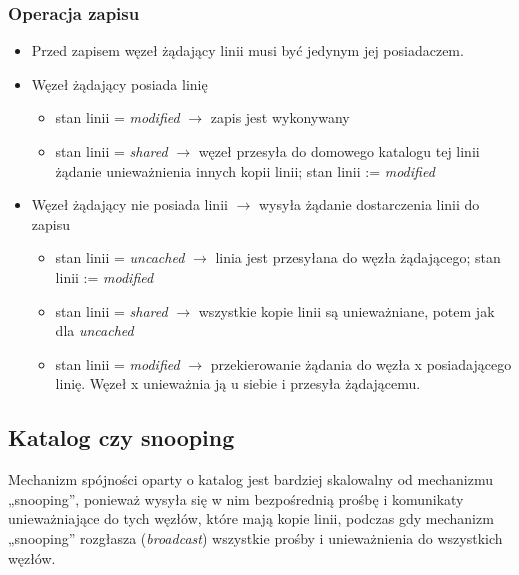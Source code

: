 \documentclass[a4paper,twoside]{article}
\begin{document}
\subsubsection{Operacja zapisu}
\begin{itemize}
	\item Przed zapisem węzeł żądający linii musi być jedynym jej posiadaczem.
	\item Węzeł żądający posiada linię
	\begin{itemize}
		\item stan linii = \textit{modified} $ \rightarrow $ zapis jest wykonywany
		\item stan linii = \textit{shared} $ \rightarrow $ węzeł przesyła do domowego katalogu tej linii żądanie unieważnienia innych kopii linii; stan linii := \textit{modified}
	\end{itemize}
	\item Węzeł żądający nie posiada linii $ \rightarrow $ wysyła żądanie dostarczenia linii do zapisu
	\begin{itemize}
		\item stan linii = \textit{uncached} $ \rightarrow $ linia jest przesyłana do węzła żądającego; stan linii := \textit{modified}
		\item stan linii = \textit{shared} $ \rightarrow $ wszystkie kopie linii są unieważniane, potem jak dla \textit{uncached}
		\item stan linii = \textit{modified} $ \rightarrow $ przekierowanie żądania do węzła x posiadającego linię. Węzeł x unieważnia ją u siebie i przesyła żądającemu.
	\end{itemize}
\end{itemize}
\subsection{Katalog czy snooping}
Mechanizm spójności oparty o katalog jest bardziej skalowalny od mechanizmu „snooping”, ponieważ wysyła się w nim bezpośrednią prośbę i komunikaty unieważniające do tych węzłów, które mają kopie linii, podczas gdy mechanizm „snooping” rozgłasza (\emph{broadcast}) wszystkie prośby i unieważnienia do wszystkich węzłów.
\end{document}
